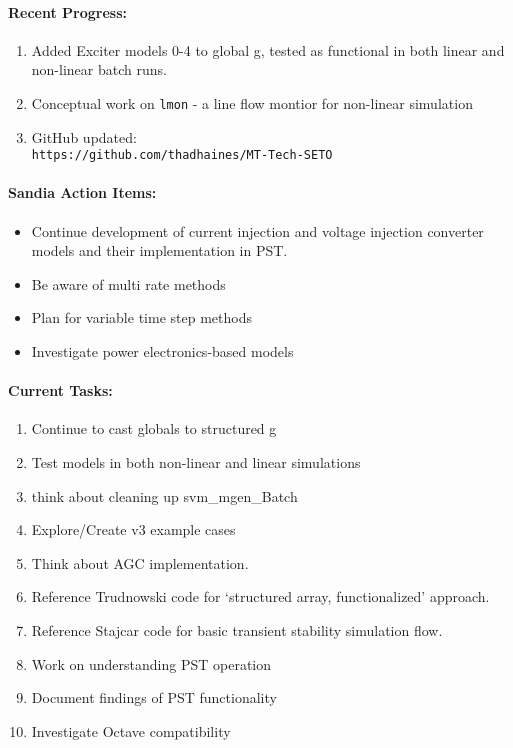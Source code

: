 \documentclass[12pt]{article}
\begin{document}
\begin{multicols}{2}
\raggedright

\paragraph{Recent Progress:}
	\begin{enumerate}
		\itemsep0em 
		\item Added Exciter models 0-4 to global g, tested as functional in both linear and non-linear batch runs.
		\item Conceptual work on \verb|lmon| - a line flow montior for non-linear simulation
		\item GitHub updated:\\
	{\footnotesize	\verb|https://github.com/thadhaines/MT-Tech-SETO| }\\
	\end{enumerate}
	

\paragraph{Sandia Action Items:}
	\begin{itemize}
		\itemsep 0em 
			\item Continue development of current injection and voltage injection converter models and their implementation in PST.
			\item Be aware of multi rate methods
			\item Plan for variable time step methods
			\item Investigate power electronics-based models
	\end{itemize}

	
\paragraph{Current Tasks:}
	\begin{enumerate}
		\itemsep 0em 
		\item Continue to cast globals to structured g
		\item Test models in both non-linear and linear simulations
		\item think about cleaning up svm\_mgen\_Batch
		\item Explore/Create v3 example cases
		\item Think about AGC implementation.
		\item Reference Trudnowski code for `structured array, functionalized' approach.
		\item Reference Stajcar code for basic transient stability simulation flow.
		\item Work on understanding PST operation
		\item Document findings of PST functionality
		\item Investigate Octave compatibility
\end{enumerate}


\end{multicols}
\end{document}
